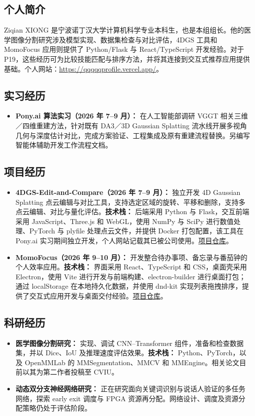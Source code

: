 \documentclass[a4paper,12pt]{article}
\begin{document}
\subsection*{个人简介}
Ziqian XIONG 是宁波诺丁汉大学计算机科学专业本科生，也是本组组长。他的医学图像分割研究涉及模型实现、数据集检查与对比评估，4DGS 工具和 MomoFocus 应用则提供了 Python/Flask 与 React/TypeScript 开发经验。对于 P19，这些经历可为比较技能匹配与排序方法，并将其连接到交互式推荐应用提供基础。个人网站：\url{https://qqqqqprofile.vercel.app/}。

\subsection*{实习经历}
\begin{itemize}
  \item \textbf{Pony.ai 算法实习（2026 年 7--9 月）：} 在人工智能部调研 VGGT 相关三维／四维重建方法，针对既有 DA3／3D Gaussian Splatting 流水线开展多视角几何与深度估计对比，完成方案验证、工程集成及原有重建流程替换。另编写智能体辅助开发工作流程文档。
\end{itemize}

\subsection*{项目经历}
\begin{itemize}
  \item \textbf{4DGS-Edit-and-Compare（2026 年 7--9 月）：} 独立开发 4D Gaussian Splatting 点云编辑与对比工具，支持选定区域的旋转、平移和删除，支持多点云编辑、对比与量化评估。\textbf{技术栈：} 后端采用 Python 与 Flask，交互前端采用 JavaScript、Three.js 和 WebGL，使用 NumPy 与 SciPy 进行数值处理、PyTorch 与 plyfile 处理点云文件，并提供 Docker 打包配置，该工具在 Pony.ai 实习期间独立开发，个人网站记载其已被公司使用。\href{https://github.com/qianqqqqqXZQ/4DGS-Edit-and-Compare}{项目仓库}。
  \item \textbf{MomoFocus（2026 年 9--10 月）：} 开发整合待办事项、备忘录与番茄钟的个人效率应用。\textbf{技术栈：} 界面采用 React、TypeScript 和 CSS，桌面壳采用 Electron，使用 Vite 进行开发与前端构建、electron-builder 进行桌面打包；通过 localStorage 在本地持久化数据，并使用 dnd-kit 实现列表拖拽排序，提供了交互式应用开发与桌面交付经验。\href{https://github.com/qianqqqqqXZQ/MomoFocus}{项目仓库}。
\end{itemize}

\subsection*{科研经历}
\begin{itemize}
  \item \textbf{医学图像分割研究：} 实现、调试 CNN--Transformer 组件，准备和检查数据集，并以 Dice、IoU 及推理速度评估效果。\textbf{技术栈：} Python、PyTorch，以及 OpenMMLab 的 MMSegmentation、MMCV 和 MMEngine。相关论文目前以其为第二作者投稿至 CVIU。
  \item \textbf{动态双分支神经网络研究：} 正在研究面向关键词识别与说话人验证的多任务网络，探索 early exit 调度与 FPGA 资源再分配。网络设计、调度及资源分配策略仍处于评估阶段。
\end{itemize}
\end{document}
